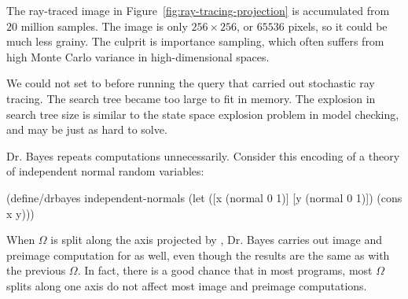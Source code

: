 The ray-traced image in Figure~\ref{fig:ray-tracing-projection} is accumulated from $20$ million samples.
The image is only $256 \times 256$, or $65536$ pixels, so it could be much less grainy.
The culprit is importance sampling, which often suffers from high Monte Carlo variance in high-dimensional spaces.

We could not set  to  before running the query that carried out stochastic ray tracing.
The search tree became too large to fit in memory.
The explosion in search tree size is similar to the state space explosion problem in model checking, and may be just as hard to solve.

Dr. Bayes repeats computations unnecessarily.
Consider this encoding of a theory of independent normal random variables:
\begin{center}\singlespacing
\begin{schemedisplay}
(define/drbayes independent-normals
  (let ([x  (normal 0 1)]
        [y  (normal 0 1)])
    (cons x y)))
\end{schemedisplay}
\end{center}
When $\Omega$ is split along the axis projected by , Dr. Bayes carries out image and preimage computation for  as well, even though the results are the same as with the previous $\Omega$.
In fact, there is a good chance that in most programs, most $\Omega$ splits along one axis do not affect most image and preimage computations.

